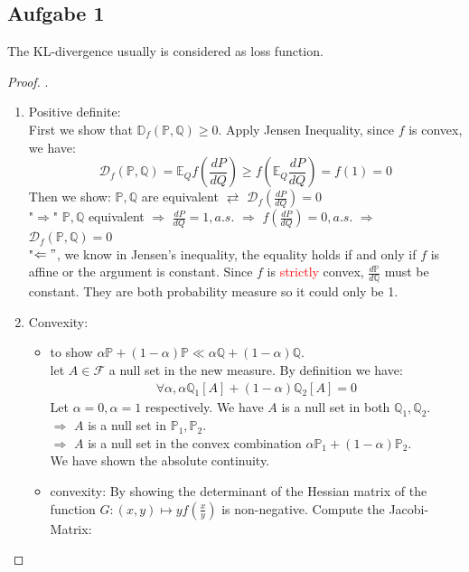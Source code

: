 \documentclass[a4paper,11pt]{article}
\theoremstyle{definition}
\theoremstyle{remark}
\begin{document}
\subsection*{Aufgabe 1}
The KL-divergence usually is considered as loss function. 
\begin{proof}.
\begin{enumerate}
	\item Positive definite:\\
	First we show that $\mathbb{D}_f(\mathbb{P}, \mathbb{Q}) \geq 0$. Apply Jensen Inequality, since $f$ is convex, we have:
	\begin{equation*}
		\mathcal{D}_f(\mathbb{P}, \mathbb{Q}) = \mathbb{E}_Qf(\frac{dP}{dQ}) \geq f(\mathbb{E}_Q\frac{dP}{dQ}) = f(1) = 0
	\end{equation*}
	Then we show: $ \mathbb{P}, \mathbb{Q}$ are equivalent $\rightleftarrows$ $\mathcal{D}_f(\frac{dP}{dQ}) = 0$\\
	"$\Rightarrow$" $\mathbb{P}, \mathbb{Q}$ equivalent $\Rightarrow$ $\frac{dP}{dQ} = 1, a.s.$ $\Rightarrow$ $f(\frac{dP}{dQ}) = 0, a.s.$ $\Rightarrow$ $\mathcal{D}_f(\mathbb{P}, \mathbb{Q}) = 0$\\
	"$\Leftarrow"$, we know in Jensen's inequality, the equality holds if and only if $f$ is affine or the argument is constant. Since $f$ is \textcolor{red}{strictly} convex, $\frac{d\mathbb{P}}{d\mathbb{Q}}$ must be constant. They are both probability measure so it could only be 1. 
	\item Convexity:
	\begin{itemize}
		\item to show $\alpha \mathbb{P} + (1-\alpha) \mathbb{P} \ll \alpha \mathbb{Q} + (1 - \alpha) \mathbb{Q}$.\\
		let $A \in \mathcal{F}$ a null set in the new measure. By definition we have:
		\begin{align*}
			\forall \alpha, \alpha \mathbb{Q}_1 [A] + (1 - \alpha)\mathbb{Q}_2 [A] = 0
		\end{align*} 
		Let $\alpha = 0, \alpha = 1$ respectively. We have $A$ is a null set in both $\mathbb{Q}_1, \mathbb{Q}_2$. \\
		$\Rightarrow$ $A$ is a null set in $\mathbb{P}_1, \mathbb{P}_2$. \\
		$\Rightarrow$ $A$ is a null set in the convex combination $\alpha\mathbb{P}_1 + (1 -\alpha)\mathbb{P}_2$.\\
		We have shown the absolute continuity.
		\item convexity: By showing the determinant of the Hessian matrix of the function $G: (x, y) \mapsto yf(\frac{x}{y})$ is non-negative. Compute the Jacobi-Matrix:

\end{itemize}
\end{enumerate}
\end{proof}
\end{document}
